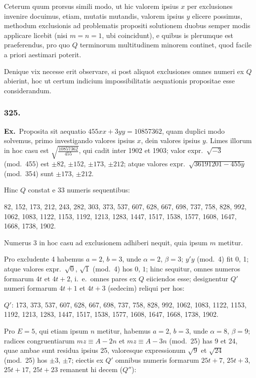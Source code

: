 \documentclass[12pt,a4paper]{article}
\theoremstyle{plain}
\theoremstyle{definition}
\theoremstyle{remark}
\begin{document}
Ceterum quum prorsus simili modo, ut hic valorem ipsius $x$ per exclusiones
invenire docuimus, etiam, mutatis mutandis, valorem ipsius $y$ elicere
possimus, methodum exclusionis ad problematis propositi solutionem duobus
semper modis applicare licebit (nisi $m=n=1$, ubi coincidunt), e quibus
is plerumque est praeferendus, pro quo $Q$ terminorum multitudinem minorem
continet, quod facile a priori aestimari poterit.

Denique vix necesse erit observare, si post aliquot exclusiones omnes
numeri ex $Q$ abierint, hoc ut certum indicium impossibilitatis aequationis
propositae esse considerandum.

\subsubsection*{325.}

\textbf{Ex.}\ Proposita sit aequatio $455xx+3yy=10857362$, quam duplici
modo solvemus, primo investigando valores ipsius $x$, dein valores ipsius $y$.
Limes illorum in hoc casu est $\sqrt{\frac{10857362}{455}}$, qui cadit inter 1902 et 1903;
valor expr.\ $\sqrt{-3}$ (mod.\ 455) est $\pm 82$, $\pm 152$, $\pm 173$, $\pm 212$; atque
valores expr.\ $\sqrt{36191201-455y}$ (mod.\ 354) sunt $\pm 173$, $\pm 212$.

Hinc $Q$ constat e 33 numeris sequentibus:

82, 152, 173, 212, 243, 282, 303, 373, 537, 607, 628, 667, 698, 737,
758, 828, 992, 1062, 1083, 1122, 1153, 1192, 1213, 1283, 1447, 1517,
1538, 1577, 1608, 1647, 1668, 1738, 1902.

Numerus 3 in hoc casu ad exclusionem adhiberi nequit, quia ipsum $m$
metitur.

Pro excludente 4 habemus $a=2$, $b=3$, unde $\alpha=2$, $\beta=3$; $y'y$ (mod.\ 4)
fit 0, 1; atque valores expr.\ $\sqrt{0}$, $\sqrt{1}$ (mod.\ 4) hos $0$, $1$; hinc sequitur,
omnes numeros formarum $4t$ et $4t+2$, i.\ e.\ omnes pares ex $Q$ eiiciendos
esse; designentur $Q'$ numeri formarum $4t+1$ et $4t+3$ (sedecim) reliqui
per hos:

$Q'$: 173, 373, 537, 607, 628, 667, 698, 737, 758, 828, 992, 1062, 1083,
1122, 1153, 1192, 1213, 1283, 1447, 1517, 1538, 1577, 1608, 1647, 1668,
1738, 1902.

Pro $E=5$, qui etiam ipsum $n$ metitur, habemus $a=2$, $b=3$, unde
$\alpha=8$, $\beta=9$; radices congruentiarum $mz\equiv A-2n$ et $mz\equiv A-3n$
(mod.\ 25) has 9 et 24, quae ambae sunt residua ipsius 25, valoresque
expressionum $\sqrt{9}$ et $\sqrt{24}$ (mod.\ 25) hos $\pm 3$, $\pm 7$; eiectis ex $Q'$ omnibus
numeris formarum $25t+7$, $25t+3$, $25t+17$, $25t+23$ remanent hi decem
($Q''$):
\end{document}
